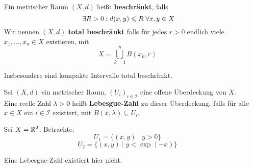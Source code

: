 \documentclass[main.tex]{subfiles}
\begin{document}
\begin{Definition}
  Ein metrischer Raum $(X,d)$ heißt \textbf{beschränkt}, falls
  $$\;\exists R > 0 : d(x,y) \leqslant R \;\forall x,y \in X$$
  Wir nennen $(X,d)$ \textbf{total beschränkt} falls für jedes $r > 0$ endlich viele $x_1, ..., x_n \in X$ existieren, mit
  $$X = \bigcup_{k=1}^n B(x_k,r)$$
\end{Definition}

\begin{Bemerkung}
  Insbesondere sind kompakte Intervalle total beschränkt.
\end{Bemerkung}

\begin{Definition}
  Sei $(X,d)$ ein metrischer Raum, $(U_i)_{i \in \mathcal{I}}$ eine offene Überdeckung von $X$. Eine reelle Zahl $\lambda > 0$ heißt \textbf{Lebesgue-Zahl} zu dieser Überdeckung, falls für alle $x \in X$ ein $i \in \mathcal{I}$ existiert, mit $B(x,\lambda) \subseteq U_i$.
\end{Definition}

\begin{Beispiel}
  Sei $X = \mathbb{R}^2$. Betrachte:
  $$U_1 = \{(x,y) \mid y > 0 \}$$
  $$U_2 = \{(x,y) \mid y < \exp(-x)\}$$
  \begin{center}
  \end{center}

  Eine Lebesgue-Zahl existiert hier nicht.
\end{Beispiel}
\end{document}
